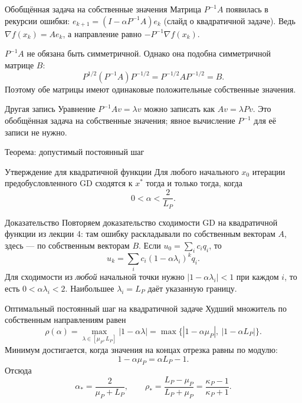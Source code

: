 \documentclass[aspectratio=169,10pt]{beamer}
\begin{document}
\begin{frame}{Обобщённая задача на собственные значения}
\small
Матрица $P^{-1}A$ появилась в рекурсии ошибки:
$e_{k+1}=(I-\alpha P^{-1}A)e_k$ (слайд о квадратичной задаче).
Ведь $\nabla f(x_k)=Ae_k$, а направление равно $-P^{-1}\nabla f(x_k)$.
\par\vspace{.3em}
$P^{-1}A$ не обязана быть симметричной. Однако она подобна симметричной матрице $B$:
\[
P^{1/2}(P^{-1}A)P^{-1/2}=P^{-1/2}AP^{-1/2}=B.
\]
Поэтому обе матрицы имеют одинаковые положительные собственные значения.
\begin{block}{Другая запись}
Уравнение $P^{-1}Av=\lambda v$ можно записать как $Av=\lambda Pv$.
Это обобщённая задача на собственные значения; явное вычисление $P^{-1}$ для её записи не нужно.
\end{block}
\end{frame}

\begin{frame}{Теорема: допустимый постоянный шаг}
\small
\begin{block}{Утверждение для квадратичной функции}
Для любого начального $x_0$ итерации предобусловленного GD сходятся к $x^*$ тогда и только тогда, когда
\[
\boxed{0<\alpha<\frac{2}{L_P}.}
\]
\end{block}
\begin{block}{Доказательство}
Повторяем доказательство сходимости GD на квадратичной функции из лекции 4:
там ошибку раскладывали по собственным векторам $A$, здесь --- по собственным векторам $B$.
Если $u_0=\sum_i c_iq_i$, то
\[
u_k=\sum_i c_i(1-\alpha\lambda_i)^kq_i.
\]
Для сходимости из \emph{любой} начальной точки нужно
$|1-\alpha\lambda_i|<1$ при каждом $i$, то есть $0<\alpha\lambda_i<2$.
Наибольшее $\lambda_i=L_P$ даёт указанную границу.
\end{block}
\end{frame}

\begin{frame}{Оптимальный постоянный шаг на квадратичной задаче}
\footnotesize
Худший множитель по собственным направлениям равен
\[
\rho(\alpha)=\max_{\lambda\in[\mu_P,L_P]}|1-\alpha\lambda|
=\max\{|1-\alpha\mu_P|,\ |1-\alpha L_P|\}.
\]
Минимум достигается, когда значения на концах отрезка равны по модулю:
\[
1-\alpha\mu_P=\alpha L_P-1.
\]
Отсюда
\[
\boxed{\alpha_*=\frac{2}{\mu_P+L_P},\qquad
\rho_*=\frac{L_P-\mu_P}{L_P+\mu_P}
=\frac{\kappa_P-1}{\kappa_P+1}.}
\]
\end{frame}
\end{document}
